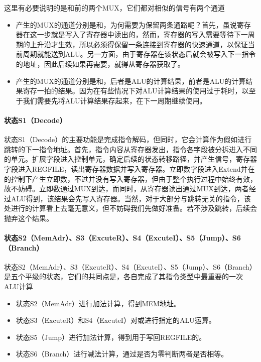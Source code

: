 这里有必要说明的是和前的两个MUX，它们都对相似的信号有两个通道
\begin{itemize}
    \item 产生的MUX的通道分别是和，为何需要为保留两条通路呢？首先，虽说寄存器在这一步就是写入了寄存器中读出的，然而，寄存器的写入需要等待下一周期的上升沿才生效，所以必须得保留一条连接到寄存器的快速通道，以保证当前周期就能送到ALU。另一方面，由于寄存器在该状态后就会被写入下一指令的地址，因此后续如果再需要，就得从寄存器获取了。
    \item 产生的MUX的通道分别是和，后者是ALU的计算结果，前者是ALU的计算结果寄存一拍的结果。因为在有些情况下对ALU计算结果的使用过于耗时，以至于我们需要先将ALU计算结果存起来，在下一周期继续使用。
\end{itemize}

\paragraph{状态S1（Decode）}
状态S1（Decode）的主要功能是完成指令解码，但同时，它会计算作为假如进行跳转的下一指令地址。首先，指令内容从寄存器发出，指令各字段被分拆进入不同的单元。扩展字段进入控制单元，确定后续的状态转移路径，并产生信号，寄存器字段进入REGFILE，读出寄存器数据并写入寄存器。立即数字段进入Extend并在的控制下产生立即数，不过并没有写入寄存器，但由于整个执行过程中始终有效，故不妨碍。立即数通过MUX到达，而同时，从寄存器读出通过MUX到达，两者经过ALU得到，该结果会先写入寄存器。当然，对于大部分与跳转无关的指令，该处进行的计算看上去毫无意义，但不妨碍我们先做好准备。若不涉及跳转，后续会抛弃这个结果。

\paragraph{状态S2（MemAdr）、S3（ExcuteR）、S4（ExcuteI）、S5（Jump）、S6（Branch）}
状态S2（MemAdr）、S3（ExcuteR）、S4（ExcuteI）、S5（Jump）、S6（Branch）是五个平级的状态，它们的共同点是，各自完成了其指令类型中最重要的一次ALU计算

\begin{itemize}
    \item 状态S2（MemAdr）进行加法计算，得到MEM地址。
    \item 状态S3（ExcuteR）和S4（ExcuteI）对或进行指定的ALU运算。
    \item 状态S5（Jump）进行加法计算，得到用于写回REGFILE的。
    \item 状态S6（Branch）进行减法计算，通过是否为零判断两者是否相等。
\end{itemize}

